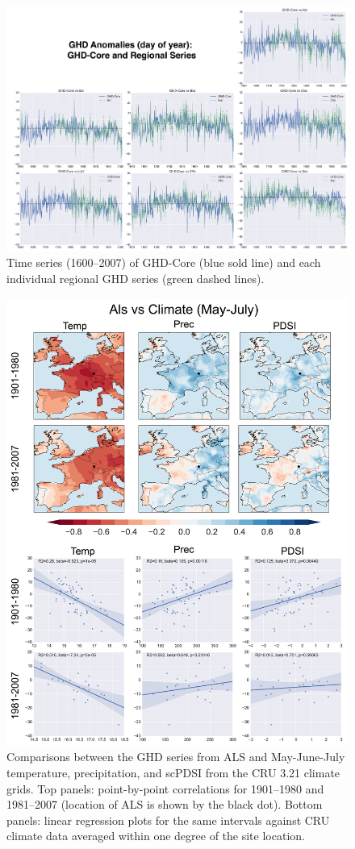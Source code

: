 \documentclass[12pt]{article}
\begin{document}
\begin{figure}
\center
\includegraphics[width=1.0\columnwidth,scale=2]{SUPP_fig_03_core_vs_sites.png}
\caption{Time series (1600--2007) of GHD-Core (blue sold line) and each individual regional GHD series (green dashed lines).}
\end{figure}

\begin{figure}
\center
\includegraphics[width=.9\columnwidth,scale=2]{SUPP_fig_04_ALS_MJJ_climate.png}
\caption{Comparisons between the GHD series from ALS and May-June-July temperature, precipitation, and scPDSI from the CRU 3.21 climate grids. Top panels: point-by-point correlations for 1901--1980 and 1981--2007 (location of ALS is shown by the black dot). Bottom panels: linear regression plots for the same intervals against CRU climate data averaged within one degree of the site location.}
\end{figure}
\end{document}
